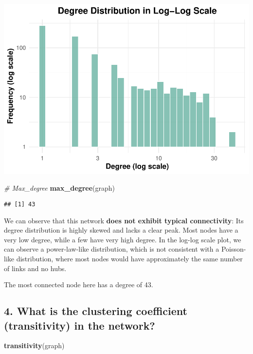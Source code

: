 \documentclass[
]{article}
\newenvironment{Shaded}{\begin{snugshade}}{\end{snugshade}}
\newcommand{\CommentTok}[1]{\textcolor[rgb]{0.56,0.35,0.01}{\textit{#1}}}
\newcommand{\FunctionTok}[1]{\textcolor[rgb]{0.13,0.29,0.53}{\textbf{#1}}}
\newcommand{\NormalTok}[1]{#1}
\begin{document}
\includegraphics{export-network_files/figure-latex/unnamed-chunk-8-2.pdf}

\begin{Shaded}
\begin{Highlighting}[]
\CommentTok{\# Max\_degree}
\FunctionTok{max\_degree}\NormalTok{(graph)}
\end{Highlighting}
\end{Shaded}

\begin{verbatim}
## [1] 43
\end{verbatim}

We can observe that this network \textbf{does not exhibit typical
connectivity}: Its degree distribution is highly skewed and lacks a
clear peak. Most nodes have a very low degree, while a few have very
high degree. In the log-log scale plot, we can observe a power-law-like
distribution, which is not consistent with a Poisson-like distribution,
where most nodes would have approximately the same number of links and
no hubs.

The most connected node here has a degree of 43.

\subsection{4. What is the clustering coefficient (transitivity) in the
network?}\label{what-is-the-clustering-coefficient-transitivity-in-the-network}

\begin{Shaded}
\begin{Highlighting}[]
\FunctionTok{transitivity}\NormalTok{(graph)}
\end{Highlighting}
\end{Shaded}
\end{document}
